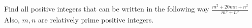 Find all positive integers that can be written in the following way $\frac{m^2 + 20mn + n^2}{m^3 + n^3}$
Also, $m,n$ are relatively prime positive integers.